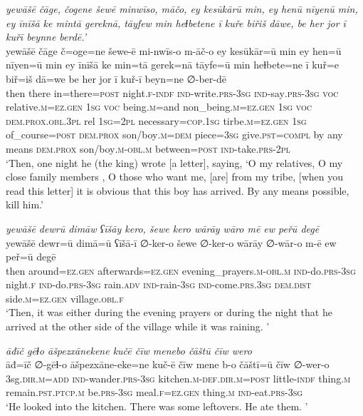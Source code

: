 \ea \label{KŠ.56}
\textit{yewāšē čāge, čogene šewē minwīso, māčo, ey kesūkārū min, ey henū nīyenū min, ey īnīšā ke mintā gereknā, tāyfew min heɫbetene ī kuře biřiš dāwe, be her jor ī kuřī beynne berdē.’} \\ 
\gll yewāšē čāge č=oge=ne šewe-ē mi-nwīs-o m-āč-o ey kesūkār=ū min ey hen=ū nīyen=ū min ey īnīšā ke min=tā gerek=nā tāyfe=ū min heɫbete=ne ī kuř=e biř=iš dā=we be her jor ī kuř-ī beyn=ne ∅-ber-dē \\ 
 then there in=there\textsc{=\textsc{post}} night\textsc{.f}\textsc{-indf} \textsc{ind-}write\textsc{.prs}\textsc{-3sg} \textsc{ind-}say\textsc{.prs}\textsc{-3sg} \textsc{voc} relative\textsc{.m}\textsc{\textsc{=ez.gen}} \textsc{1sg} \textsc{voc} being\textsc{.m}=and non\_being\textsc{.m}\textsc{\textsc{=ez.gen}} \textsc{1sg} \textsc{voc} \textsc{dem.prox}\textsc{.obl}\textsc{.3pl} rel \textsc{1sg}=\textsc{2pl} necessary\textsc{=cop}\textsc{.\textsc{1sg}} tirbe\textsc{.m}\textsc{\textsc{=ez.gen}} \textsc{1sg} of\_course\textsc{=\textsc{post}} \textsc{dem.prox} son/boy\textsc{.m}\textsc{=dem} piece\textsc{=3sg} give\textsc{.pst}\textsc{=compl} by any means \textsc{dem.prox} son/boy\textsc{.m}\textsc{-obl}\textsc{.m} between\textsc{=\textsc{post}} \textsc{ind-}take\textsc{.prs}-\textsc{2pl} \\ 
\glt `Then, one night he (the king) wrote [a letter], saying, ‘O my relatives, O my close family members , O those who want me, [are] from my tribe, [when you read this letter] it is obvious that this boy has arrived. By any means possible, kill him.'
\z 
 
\ea \label{KŠ.59}
\textit{yewāšē dewrū dimāw ʕīšāy kero, šewe kero wārāy wāro mē ew peřū degē} \\ 
\gll yewāšē dewr=ū dimā=ū ʕīšā-ī ∅-ker-o šewe ∅-ker-o wārāy ∅-wār-o m-ē ew peř=ū degē \\ 
 then around\textsc{\textsc{=ez.gen}} afterwards\textsc{\textsc{=ez.gen}} evening\_prayers\textsc{.m}\textsc{-obl}\textsc{.m} \textsc{ind-}do\textsc{.prs}\textsc{-3sg} night\textsc{.f} \textsc{ind-}do\textsc{.prs}\textsc{-3sg} rain\textsc{.adv} \textsc{ind-}rain\textsc{-3sg} \textsc{ind-}come\textsc{.prs}\textsc{.3sg} \textsc{dem.dist} side\textsc{.m}\textsc{\textsc{=ez.gen}} village\textsc{.obl}\textsc{.f} \\ 
\glt `Then, it was either during the evening prayers or during the night that he arrived at the other side of the village while it was raining. '
\z 
 
\ea \label{KŠ.63}
\textit{āđīč gēɫo āšpezxānekene kučē čīw menebo čāštū čīw wero} \\ 
\gll āđ=īč ∅-gēɫ-o āšpezxāne-eke=ne kuč-ē čīw mene b-o čāštī=ū čīw ∅-wer-o \\ 
 3sg\textsc{.dir}\textsc{.m}\textsc{=add} \textsc{ind-}wander\textsc{.prs}\textsc{-3sg} kitchen\textsc{.m}\textsc{-def}\textsc{.dir}\textsc{.m}\textsc{=\textsc{post}} little\textsc{-indf} thing\textsc{.m} remain\textsc{.pst}\textsc{.ptcp}\textsc{.m} be\textsc{.prs}\textsc{-3sg} meal\textsc{.f}\textsc{\textsc{=ez.gen}} thing\textsc{.m} \textsc{ind-}eat\textsc{.prs}\textsc{-3sg} \\ 
\glt `He looked into the kitchen. There was some leftovers. He ate them. '
\z 
 
